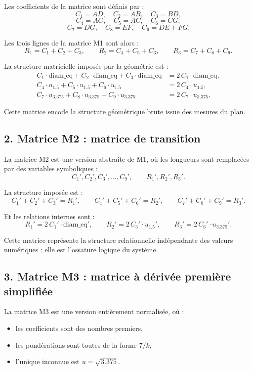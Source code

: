 \documentclass[12pt,a4paper]{article}
\theoremstyle{definition}
\theoremstyle{remark}
\begin{document}
Les coefficients de la matrice sont définis par :
\[
  C_1 = AD,\quad C_2 = AB,\quad C_3 = BD,
\]
\[
  C_4 = AG,\quad C_5 = AC,\quad C_6 = CG,
\]
\[
  C_7 = DG,\quad C_8 = EF,\quad C_9 = DE + FG.
\]

Les trois lignes de la matrice M1 sont alors :
\[
  R_1 = C_1 + C_2 + C_3,\qquad
  R_2 = C_4 + C_5 + C_6,\qquad
  R_3 = C_7 + C_8 + C_9.
\]

La structure matricielle imposée par la géométrie est :
\[
  \begin{aligned}
    C_1 \cdot \mathrm{diam\_eq} + C_2 \cdot \mathrm{diam\_eq} + C_3 \cdot \mathrm{diam\_eq}
      &= 2\, C_1 \cdot \mathrm{diam\_eq}, \\
    C_4 \cdot u_{1.5} + C_5 \cdot u_{1.5} + C_6 \cdot u_{1.5}
      &= 2\, C_4 \cdot u_{1.5}, \\
    C_7 \cdot u_{3.375} + C_8 \cdot u_{3.375} + C_9 \cdot u_{3.375}
      &= 2\, C_7 \cdot u_{3.375}.
  \end{aligned}
\]

Cette matrice encode la structure géométrique brute issue des mesures du plan.

\subsection{2. Matrice M2 : matrice de transition}

La matrice M2 est une version abstraite de M1, où les longueurs sont remplacées
par des variables symboliques :
\[
  C_1', C_2', C_3',\dots,C_9',\qquad R_1', R_2', R_3'.
\]

La structure imposée est :
\[
  C_1' + C_2' + C_3' = R_1',\qquad
  C_4' + C_5' + C_6' = R_2',\qquad
  C_7' + C_8' + C_9' = R_3'.
\]

Et les relations internes sont :
\[
  R_1' = 2\, C_1' \cdot \mathrm{diam\_eq}',\qquad
  R_2' = 2\, C_3' \cdot u_{1.5}',\qquad
  R_3' = 2\, C_6' \cdot u_{3.375}'.
\]

Cette matrice représente la structure relationnelle indépendante des valeurs
numériques : elle est l’ossature logique du système.

\subsection{3. Matrice M3 : matrice à dérivée première simplifiée}

La matrice M3 est une version entièrement normalisée, où :
\begin{itemize}
  \item les coefficients sont des nombres premiers,
  \item les pondérations sont toutes de la forme \(7 / k\),
  \item l’unique inconnue est \(u = \sqrt{3.375}\).
\end{itemize}
\end{document}
